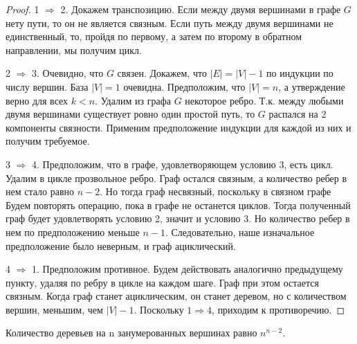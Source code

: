 \begin{proof}
	\;
	
	1 $\Rightarrow$ 2. 
	Докажем транспозицию.
	Если между двумя вершинами в графе $G$ нету пути, то он не является связным. Если путь между двумя вершинами не единственный, то, пройдя по первому, а затем по второму в обратном  направлении, мы получим цикл.
	
	2 $\Rightarrow $ 3.
	Очевидно, что $G$ связен. Докажем, что $|E|=|V| - 1$ по индукции по числу вершин. База $|V|=1$ очевидна. Предположим, что $|V|=n$, а утверждение верно для всех $k < n$. Удалим из
	графа $G$ некоторое ребро. Т.к. между любыми двумя вершинами существует ровно один простой путь, то $G$ распался на 2 компоненты связности. Применим предположение индукции для каждой из них и получим требуемое.
	
	3 $\Rightarrow $ 4.
	Предположим, что в графе, удовлетворяющем условию 3, есть цикл. Удалим в цикле прозвольное ребро. Граф остался связным, а количество ребер в нем стало равно $n-2$. Но тогда граф несвязный, поскольку в связном графе Будем повторять операцию, пока в графе не останется циклов. Тогда полученный граф будет удовлетворять условию 2, значит и условию 3. Но количество ребер в нем по предположению меньше $n - 1$. Следовательно, наше изначальное предположение было неверным, и граф ациклический.
	
	4 $\Rightarrow $ 1.
	Предположим противное. Будем действовать аналогично предыдущему пункту, удаляя по ребру в цикле на каждом шаге. Граф при этом остается связным. Когда граф станет ациклическим, он станет деревом, но с количеством вершин, меньшим, чем $|V| - 1$. Поскольку $1 \Rightarrow 4$, приходим к противоречию.
\end{proof}

\begin{theorem}[Кэли]
	Количество деревьев на n занумерованных вершинах равно $n^{n - 2}$.
\end{theorem}


